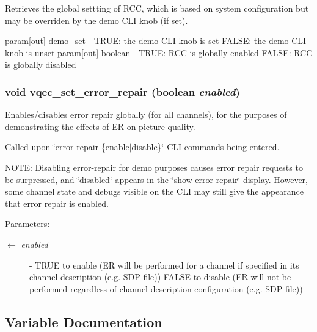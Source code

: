 Retrieves the global settting of RCC, which is based on system configuration but may be overriden by the demo CLI knob (if set).

param[out] demo\_\-set - TRUE: the demo CLI knob is set FALSE: the demo CLI knob is unset param[out] boolean - TRUE: RCC is globally enabled FALSE: RCC is globally disabled 
\subsubsection{\setlength{\rightskip}{0pt plus 5cm}void vqec\_\-set\_\-error\_\-repair (boolean {\em enabled})}\label{vqec__gap__reporter_8c_e00fa4263506be5328566209134943cb}


Enables/disables error repair globally (for all channels), for the purposes of demonstrating the effects of ER on picture quality.

Called upon \char`\"{}error-repair \{enable$|$disable\}\char`\"{} CLI commands being entered.

NOTE: Disabling error-repair for demo purposes causes error repair requests to be surpressed, and \char`\"{}disabled\char`\"{} appears in the \char`\"{}show error-repair\char`\"{} display. However, some channel state and debugs visible on the CLI may still give the appearance that error repair is enabled.

\begin{Desc}
\item[Parameters:]
\begin{description}
\item[\mbox{$\leftarrow$} {\em enabled}]- TRUE to enable (ER will be performed for a channel if specified in its channel description (e.g. SDP file)) FALSE to disable (ER will not be performed regardless of channel description configuration (e.g. SDP file)) \end{description}
\end{Desc}


\subsection{Variable Documentation}

